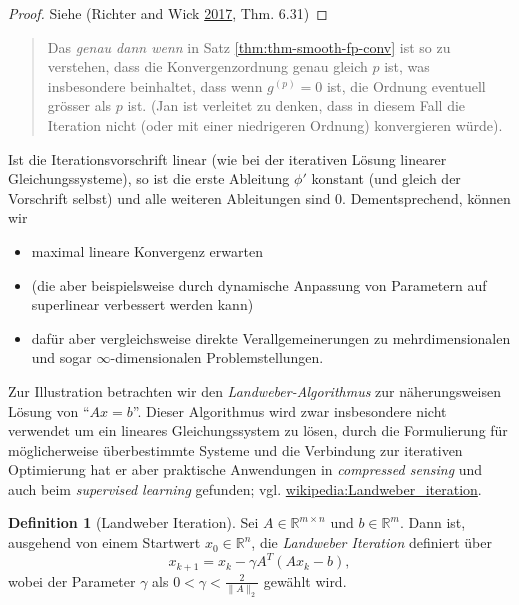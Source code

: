 \documentclass[
]{book}
\providecommand{\tightlist}{%
  \setlength{\itemsep}{0pt}\setlength{\parskip}{0pt}}
\newenvironment {JHSAYS} [0] {\begin{quote}\color{jhsc}} {\end{quote}}
\theoremstyle{definition}
\newtheorem{definition}{Definition}[chapter]
\theoremstyle{definition}
\theoremstyle{definition}
\theoremstyle{definition}
\theoremstyle{remark}
\begin{document}
\begin{proof}
Siehe (Richter and Wick \protect\hyperlink{ref-RicW17}{2017}, Thm. 6.31)
\end{proof}

\leavevmode\hypertarget{rem-smooth-fp-conv}{}%
\begin{JHSAYS}
Das \emph{genau dann wenn} in Satz \ref{thm:thm-smooth-fp-conv} ist so zu verstehen, dass die Konvergenzordnung genau gleich \(p\) ist, was insbesondere beinhaltet, dass wenn \(g^{(p)}=0\) ist, die Ordnung eventuell grösser als \(p\) ist. (Jan ist verleitet zu denken, dass in diesem Fall die Iteration nicht (oder mit einer niedrigeren Ordnung) konvergieren würde).

\end{JHSAYS}

Ist die Iterationsvorschrift linear (wie bei der iterativen Lösung linearer Gleichungssysteme), so ist die erste Ableitung \(\phi'\) konstant (und gleich der Vorschrift selbst) und alle weiteren Ableitungen sind \(0\). Dementsprechend, können wir

\begin{itemize}
\tightlist
\item
  maximal lineare Konvergenz erwarten
\item
  (die aber beispielsweise durch dynamische Anpassung von Parametern auf superlinear verbessert werden kann)
\item
  dafür aber vergleichsweise direkte Verallgemeinerungen zu mehrdimensionalen und sogar \(\infty\)-dimensionalen Problemstellungen.
\end{itemize}

Zur Illustration betrachten wir den \emph{Landweber-Algorithmus} zur näherungsweisen Lösung von ``\(Ax=b\)''.
Dieser Algorithmus wird zwar insbesondere nicht verwendet um ein lineares Gleichungssystem zu lösen, durch die Formulierung für möglicherweise überbestimmte Systeme und die Verbindung zur iterativen Optimierung hat er aber praktische Anwendungen in \emph{compressed sensing} und auch beim \emph{supervised learning} gefunden; vgl. \href{https://en.wikipedia.org/wiki/Landweber_iteration}{wikipedia:Landweber\_iteration}.

\begin{definition}[Landweber Iteration]
\protect\hypertarget{def:def-landweber-alg}{}\label{def:def-landweber-alg}Sei \(A\in \mathbb R^{m\times n}\) und \(b\in \mathbb R^{m}\). Dann ist, ausgehend von einem Startwert \(x_0 \in \mathbb R^{n}\), die \emph{Landweber Iteration} definiert über
\begin{equation*}
x_{k+1} = x_k - \gamma A^T(Ax_k -b ),
\end{equation*}
wobei der Parameter \(\gamma\) als \(0<\gamma< \frac{2}{\|A\|_2}\) gewählt wird.
\end{definition}
\end{document}
